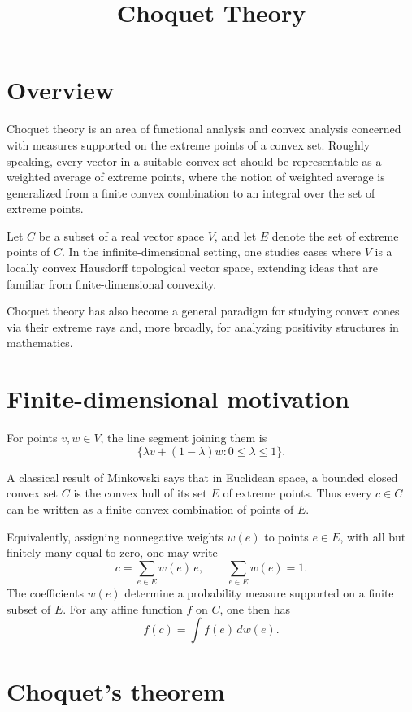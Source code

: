 \documentclass[11pt]{article}
\title{Choquet Theory}
\author{}
\date{}
\begin{document}
\maketitle

\section*{Overview}

Choquet theory is an area of functional analysis and convex analysis concerned with measures supported on the extreme points of a convex set. Roughly speaking, every vector in a suitable convex set should be representable as a weighted average of extreme points, where the notion of weighted average is generalized from a finite convex combination to an integral over the set of extreme points.

Let $C$ be a subset of a real vector space $V$, and let $E$ denote the set of extreme points of $C$. In the infinite-dimensional setting, one studies cases where $V$ is a locally convex Hausdorff topological vector space, extending ideas that are familiar from finite-dimensional convexity.

Choquet theory has also become a general paradigm for studying convex cones via their extreme rays and, more broadly, for analyzing positivity structures in mathematics.

\section*{Finite-dimensional motivation}

For points $v,w \in V$, the line segment joining them is
\[
\{ \lambda v + (1-\lambda) w : 0 \le \lambda \le 1 \}.
\]

A classical result of Minkowski says that in Euclidean space, a bounded closed convex set $C$ is the convex hull of its set $E$ of extreme points. Thus every $c \in C$ can be written as a finite convex combination of points of $E$.

Equivalently, assigning nonnegative weights $w(e)$ to points $e \in E$, with all but finitely many equal to zero, one may write
\[
c = \sum_{e \in E} w(e)\, e,
\qquad
\sum_{e \in E} w(e) = 1.
\]
The coefficients $w(e)$ determine a probability measure supported on a finite subset of $E$. For any affine function $f$ on $C$, one then has
\[
f(c) = \int f(e)\, dw(e).
\]

\section*{Choquet's theorem}
\end{document}
